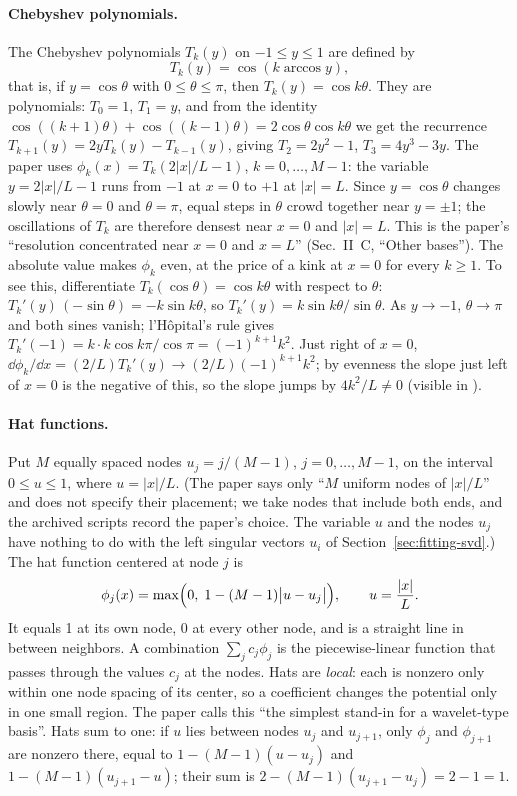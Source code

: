 \paragraph{Chebyshev polynomials.} The Chebyshev polynomials $T_k(y)$ on $-1\le y\le1$ are defined by
\begin{equation}
T_k(y)=\cos(k\arccos y),
\label{eq:fitting-cheb}
\end{equation}
that is, if $y=\cos\theta$ with $0\le\theta\le\pi$, then $T_k(y)=\cos k\theta$. They are polynomials: $T_0=1$, $T_1=y$, and from the identity $\cos((k+1)\theta)+\cos((k-1)\theta)=2\cos\theta\cos k\theta$ we get the recurrence $T_{k+1}(y)=2yT_k(y)-T_{k-1}(y)$, giving $T_2=2y^2-1$, $T_3=4y^3-3y$. The paper uses $\phi_k(x)=T_k(2|x|/L-1)$, $k=0,\dots,M-1$: the variable $y=2|x|/L-1$ runs from $-1$ at $x=0$ to $+1$ at $|x|=L$. Since $y=\cos\theta$ changes slowly near $\theta=0$ and $\theta=\pi$, equal steps in $\theta$ crowd together near $y=\pm1$; the oscillations of $T_k$ are therefore densest near $x=0$ and $|x|=L$. This is the paper's ``resolution concentrated near $x=0$ and $x=L$'' (Sec.~II~C, ``Other bases''). The absolute value makes $\phi_k$ even, at the price of a kink at $x=0$ for every $k\ge1$. To see this, differentiate $T_k(\cos\theta)=\cos k\theta$ with respect to $\theta$: $T_k'(y)\,(-\sin\theta)=-k\sin k\theta$, so $T_k'(y)=k\sin k\theta/\sin\theta$. As $y\to-1$, $\theta\to\pi$ and both sines vanish; l'H\^opital's rule gives $T_k'(-1)=k\cdot k\cos k\pi/\cos\pi=(-1)^{k+1}k^2$. Just right of $x=0$, $\dd\phi_k/\dd x=(2/L)T_k'(y)\to(2/L)(-1)^{k+1}k^2$; by evenness the slope just left of $x=0$ is the negative of this, so the slope jumps by $4k^2/L\neq0$ (visible in ).

\paragraph{Hat functions.} Put $M$ equally spaced nodes $u_j=j/(M-1)$, $j=0,\dots,M-1$, on the interval $0\le u\le1$, where $u=|x|/L$. (The paper says only ``$M$ uniform nodes of $|x|/L$'' and does not specify their placement; we take nodes that include both ends, and the archived scripts \cite{zenodo} record the paper's choice. The variable $u$ and the nodes $u_j$ have nothing to do with the left singular vectors $u_i$ of Section~\ref{sec:fitting-svd}.) The hat function centered at node $j$ is
\begin{equation}
\phi_j(x)=\max\Bigl(0,\;1-(M-1)\bigl|u-u_j\bigr|\Bigr),\qquad u=\frac{|x|}{L}.
\label{eq:fitting-hat}
\end{equation}
It equals 1 at its own node, 0 at every other node, and is a straight line in between neighbors. A combination $\sum_jc_j\phi_j$ is the piecewise-linear function that passes through the values $c_j$ at the nodes. Hats are \emph{local}: each is nonzero only within one node spacing of its center, so a coefficient changes the potential only in one small region. The paper calls this ``the simplest stand-in for a wavelet-type basis''. Hats sum to one: if $u$ lies between nodes $u_j$ and $u_{j+1}$, only $\phi_j$ and $\phi_{j+1}$ are nonzero there, equal to $1-(M-1)(u-u_j)$ and $1-(M-1)(u_{j+1}-u)$; their sum is $2-(M-1)(u_{j+1}-u_j)=2-1=1$.

